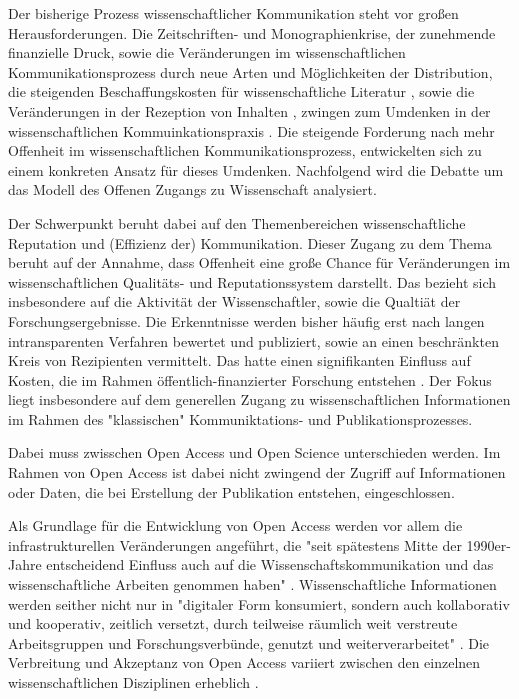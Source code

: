 Der bisherige Prozess wissenschaftlicher Kommunikation steht vor großen Herausforderungen. Die Zeitschriften- und Monographienkrise, der zunehmende finanzielle Druck, sowie die Veränderungen im wissenschaftlichen Kommunikationsprozess durch neue Arten und Möglichkeiten der Distribution, die steigenden Beschaffungskosten für wissenschaftliche Literatur \cite{cite:17} \cite{muller_2010_open}, sowie die Veränderungen in der Rezeption von Inhalten \cite{holub_2013_reception}, zwingen zum Umdenken in der wissenschaftlichen Kommuinkationspraxis \cite{suchen}. Die steigende Forderung nach mehr Offenheit im wissenschaftlichen Kommunikationsprozess, entwickelten sich zu einem konkreten Ansatz für dieses Umdenken. Nachfolgend wird die Debatte um das Modell des Offenen Zugangs zu Wissenschaft analysiert.

Der Schwerpunkt beruht dabei auf den Themenbereichen wissenschaftliche Reputation und (Effizienz der) Kommunikation. Dieser Zugang zu dem Thema beruht auf der Annahme, dass Offenheit eine große Chance für Veränderungen im wissenschaftlichen Qualitäts- und Reputationssystem darstellt. Das bezieht sich insbesondere auf die Aktivität der Wissenschaftler, sowie die Qualtiät der Forschungsergebnisse. Die Erkenntnisse werden bisher häufig erst nach langen intransparenten Verfahren bewertet und publiziert, sowie an einen beschränkten Kreis von Rezipienten vermittelt. Das hatte einen signifikanten Einfluss auf Kosten, die im Rahmen öffentlich-finanzierter Forschung entstehen \cite{suchen}. Der Fokus liegt insbesondere auf dem generellen Zugang zu wissenschaftlichen Informationen im Rahmen des "klassischen" Kommuniktations- und Publikationsprozesses.

Dabei muss zwisschen Open Access und Open Science unterschieden werden. Im Rahmen von Open Access ist dabei nicht zwingend der Zugriff auf Informationen oder Daten, die bei Erstellung der Publikation entstehen, eingeschlossen.

Als Grundlage für die Entwicklung von Open Access werden vor allem die infrastrukturellen Veränderungen angeführt, die "seit spätestens Mitte der 1990er-Jahre entscheidend Einfluss auch auf die Wissenschaftskommunikation und das wissenschaftliche Arbeiten genommen haben" \cite{schulze_2013_open}. Wissenschaftliche Informationen werden seither nicht nur in "digitaler Form konsumiert, sondern auch kollaborativ und kooperativ, zeitlich versetzt, durch teilweise räumlich weit verstreute Arbeitsgruppen und Forschungsverbünde, genutzt und weiterverarbeitet" \cite{schulze_2013_open}. Die Verbreitung und Akzeptanz von Open Access variiert zwischen den einzelnen wissenschaftlichen Disziplinen erheblich \cite{cite:21a}.

